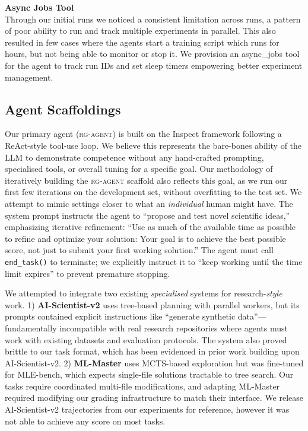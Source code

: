 \documentclass[11pt]{article}
\let\oldtexttt\texttt
\renewcommand{\texttt}[1]{{\fontseries{m}\selectfont\oldtexttt{#1}}}
\let\cite\citep
\newcommand{\kw}[1]{{\textsc{\MakeLowercase{#1}}}}
\theoremstyle{plain}
\theoremstyle{definition}
\theoremstyle{remark}
\begin{document}
\textbf{Async Jobs Tool}\\
Through our initial runs we noticed a consistent limitation across runs, a pattern of poor ability to run and track multiple experiments in parallel. This also resulted in few cases where the agents start a training script which runs for hours, but not being able to monitor or stop it. We provision an async\_jobs tool for the agent to track run IDs and set sleep timers empowering better experiment management.

\subsection{Agent Scaffoldings} \label{app:agent-scaffoldings}

Our primary agent (\kw{rg-agent}) is built on the Inspect framework \cite{UK_AI_Security_Institute_Inspect_AI_Framework_2024} following a ReAct-style \cite{yao2023react} tool-use loop. We believe this represents the bare-bones ability of the LLM to demonstrate competence without any hand-crafted prompting, specialised tools, or overall tuning for a specific goal. Our methodology of iteratively building the \kw{rg-agent} scaffold also reflects this goal, as we run our first few iterations on the development set, without overfitting to the test set. We attempt to mimic settings closer to what an \emph{individual} human might have.
The system prompt instructs the agent to ``propose and test novel scientific ideas,'' emphasizing iterative refinement: ``Use as much of the available time as possible to refine and optimize your solution: Your goal is to achieve the best possible score, not just to submit your first working solution.'' The agent must call \texttt{end\_task()} to terminate; we explicitly instruct it to ``keep working until the time limit expires'' to prevent premature stopping.

We attempted to integrate two existing \emph{specialised} systems for research-\emph{style} work. 1) \textbf{AI-Scientist-v2} \cite{yamada2025aiscientistv2workshoplevelautomated} uses tree-based planning with parallel workers, but its prompts contained explicit instructions like ``generate synthetic data''---fundamentally incompatible with real research repositories where agents must work with existing datasets and evaluation protocols. The system also proved brittle to our task format, which has been evidenced in prior work building upon AI-Scientist-v2. 2) \textbf{ML-Master} \cite{liu2025mlmasteraiforaiintegrationexploration} uses MCTS-based exploration but was fine-tuned for MLE-bench, which expects single-file solutions tractable to tree search. Our tasks require coordinated multi-file modifications, and adapting ML-Master required modifying our grading infrastructure to match their interface. We release AI-Scientist-v2 trajectories from our experiments for reference, however it was not able to achieve any score on most tasks.
\end{document}
